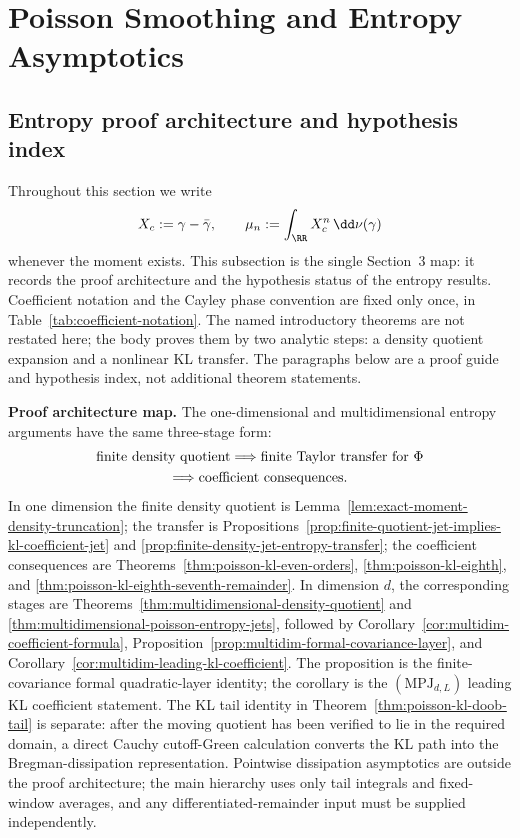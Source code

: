 \section{Poisson Smoothing and Entropy Asymptotics}%
\label{sec:entropy-asymptotics}

\subsection*{Entropy proof architecture and hypothesis index}\label{sec:entropy-theorem-map}

Throughout this section we write
\[
X_c:=\gamma-\bar{\gamma},\qquad
\mu_n:=\int_{\RR}X_c^n\,\dd\nu(\gamma)
\]
whenever the moment exists.  This subsection is the single Section~3 map: it
records the proof architecture and the hypothesis status of the entropy
results.  Coefficient notation and the Cayley phase convention are fixed only
once, in Table~\ref{tab:coefficient-notation}.  The named introductory
theorems are not restated here; the body proves them by two analytic steps:
a density quotient expansion and a nonlinear KL transfer.  The paragraphs
below are a proof guide and hypothesis index, not additional theorem
statements.

\medskip
\noindent\textbf{Proof architecture map.}
The one-dimensional and multidimensional entropy arguments have the same
three-stage form:
\[
\begin{gathered}
\hbox{finite density quotient}
\Longrightarrow
\hbox{finite Taylor transfer for }\Phi\\
\Longrightarrow
\hbox{coefficient consequences}.
\end{gathered}
\]
In one dimension the finite density quotient is
Lemma~\ref{lem:exact-moment-density-truncation}; the transfer is
Propositions~\ref{prop:finite-quotient-jet-implies-kl-coefficient-jet} and
\ref{prop:finite-density-jet-entropy-transfer}; the coefficient consequences
are Theorems~\ref{thm:poisson-kl-even-orders},
\ref{thm:poisson-kl-eighth}, and
\ref{thm:poisson-kl-eighth-seventh-remainder}.  In dimension \(d\), the
corresponding stages are
Theorems~\ref{thm:multidimensional-density-quotient} and
\ref{thm:multidimensional-poisson-entropy-jets}, followed by
Corollary~\ref{cor:multidim-coefficient-formula},
Proposition~\ref{prop:multidim-formal-covariance-layer}, and
Corollary~\ref{cor:multidim-leading-kl-coefficient}.  The proposition is the
finite-covariance formal quadratic-layer identity; the corollary is the
\((\mathrm{MPJ}_{d,L})\) leading KL coefficient statement.
The KL tail identity in Theorem~\ref{thm:poisson-kl-doob-tail} is separate:
after the moving quotient has been verified to lie in the required domain, a
direct Cauchy cutoff-Green calculation converts the KL path into the
Bregman-dissipation representation.
Pointwise dissipation asymptotics are outside the proof architecture; the
main hierarchy uses only tail integrals and fixed-window averages, and any
differentiated-remainder input must be supplied independently.

